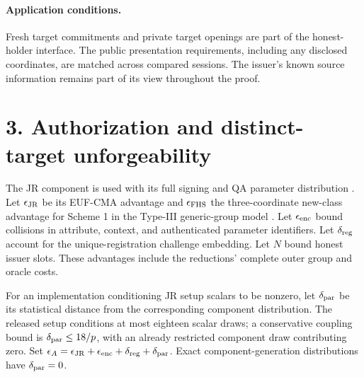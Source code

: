 \documentclass[11pt]{article}
\begin{document}
\paragraph{Application conditions.}
Fresh target commitments and private target openings are part of the honest-holder interface. The public presentation requirements, including any disclosed coordinates, are matched across compared sessions. The issuer's known source information remains part of its view throughout the proof.

\section*{3. Authorization and distinct-target unforgeability}


The JR component is used with its full signing and QA parameter distribution \cite{JR2017}. Let \(\epsilon_{\rm JR}\) be its EUF-CMA advantage and \(\epsilon_{\rm FHS}\) the three-coordinate new-class advantage for Scheme 1 in the Type-III generic-group model \cite{FHS2014}. Let \(\epsilon_{\rm enc}\) bound collisions in attribute, context, and authenticated parameter identifiers. Let \(\delta_{\rm reg}\) account for the unique-registration challenge embedding. Let \(N\) bound honest issuer slots. These advantages include the reductions' complete outer group and oracle costs.

For an implementation conditioning JR setup scalars to be nonzero, let \(\delta_{\rm par}\) be its statistical distance from the corresponding component distribution. The released setup conditions at most eighteen scalar draws; a conservative coupling bound is \(\delta_{\rm par}\le18/p\), with an already restricted component draw contributing zero. Set \(\epsilon_A=\epsilon_{\rm JR}+\epsilon_{\rm enc}+\delta_{\rm reg}+\delta_{\rm par}\). Exact component-generation distributions have \(\delta_{\rm par}=0\).
\end{document}
